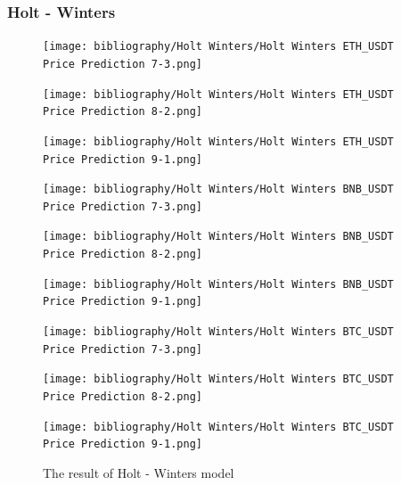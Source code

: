 \documentclass{ieeeojies}
\begin{document}
\subsubsection{Holt - Winters}
\begin{figure}[H]
    \centering
    \begin{minipage}{0.15\textwidth}
    \centering
    \texttt{[image: bibliography/Holt Winters/Holt Winters ETH\_USDT Price Prediction 7-3.png]}
    \end{minipage}
    \hfill
    \begin{minipage}{0.15\textwidth}
    \centering
    \texttt{[image: bibliography/Holt Winters/Holt Winters ETH\_USDT Price Prediction 8-2.png]}
    \end{minipage}
    \hfill
    \begin{minipage}{0.15\textwidth}
    \centering
    \texttt{[image: bibliography/Holt Winters/Holt Winters ETH\_USDT Price Prediction 9-1.png]}
    \end{minipage}
    \centering
    \begin{minipage}{0.15\textwidth}
    \centering
    \texttt{[image: bibliography/Holt Winters/Holt Winters BNB\_USDT Price Prediction 7-3.png]}
    \end{minipage}
    \hfill
    \begin{minipage}{0.15\textwidth}
    \centering
    \texttt{[image: bibliography/Holt Winters/Holt Winters BNB\_USDT Price Prediction 8-2.png]}
    \end{minipage}
    \hfill
    \begin{minipage}{0.15\textwidth}
    \centering
    \texttt{[image: bibliography/Holt Winters/Holt Winters BNB\_USDT Price Prediction 9-1.png]}
    \end{minipage}
    \centering
    \begin{minipage}{0.15\textwidth}
    \centering
    \texttt{[image: bibliography/Holt Winters/Holt Winters BTC\_USDT Price Prediction 7-3.png]}
    \end{minipage}
    \hfill
    \begin{minipage}{0.15\textwidth}
    \centering
    \texttt{[image: bibliography/Holt Winters/Holt Winters BTC\_USDT Price Prediction 8-2.png]}
    \end{minipage}
    \hfill
    \begin{minipage}{0.15\textwidth}
    \centering
    \texttt{[image: bibliography/Holt Winters/Holt Winters BTC\_USDT Price Prediction 9-1.png]}
    \end{minipage}
    \caption{The result of Holt - Winters model}
    \label{fig:enter-label}
\end{figure}
\end{document}
